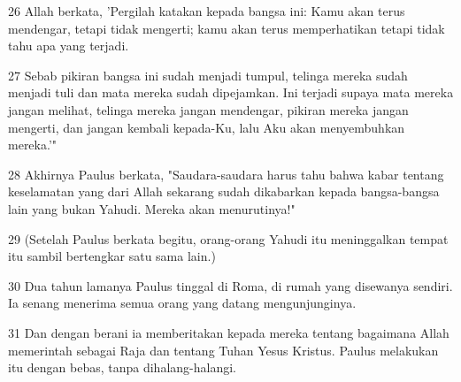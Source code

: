 \par 26 Allah berkata, 'Pergilah katakan kepada bangsa ini: Kamu akan terus mendengar, tetapi tidak mengerti; kamu akan terus memperhatikan tetapi tidak tahu apa yang terjadi.
\par 27 Sebab pikiran bangsa ini sudah menjadi tumpul, telinga mereka sudah menjadi tuli dan mata mereka sudah dipejamkan. Ini terjadi supaya mata mereka jangan melihat, telinga mereka jangan mendengar, pikiran mereka jangan mengerti, dan jangan kembali kepada-Ku, lalu Aku akan menyembuhkan mereka.'"
\par 28 Akhirnya Paulus berkata, "Saudara-saudara harus tahu bahwa kabar tentang keselamatan yang dari Allah sekarang sudah dikabarkan kepada bangsa-bangsa lain yang bukan Yahudi. Mereka akan menurutinya!"
\par 29 (Setelah Paulus berkata begitu, orang-orang Yahudi itu meninggalkan tempat itu sambil bertengkar satu sama lain.)
\par 30 Dua tahun lamanya Paulus tinggal di Roma, di rumah yang disewanya sendiri. Ia senang menerima semua orang yang datang mengunjunginya.
\par 31 Dan dengan berani ia memberitakan kepada mereka tentang bagaimana Allah memerintah sebagai Raja dan tentang Tuhan Yesus Kristus. Paulus melakukan itu dengan bebas, tanpa dihalang-halangi.


